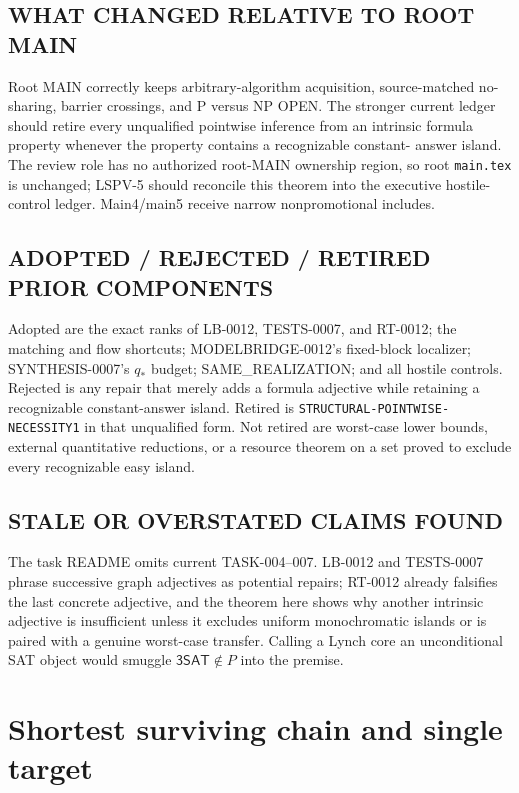\documentclass[11pt]{article}
\newcommand{\SAT}{\mathsf{3SAT}}
\begin{document}
\subsection*{WHAT CHANGED RELATIVE TO ROOT MAIN}
Root MAIN correctly keeps arbitrary-algorithm acquisition, source-matched
no-sharing, barrier crossings, and P versus NP OPEN.  The stronger current
ledger should retire every unqualified pointwise inference from an intrinsic
formula property whenever the property contains a recognizable constant-
answer island.  The review role has no authorized root-MAIN ownership
region, so root \texttt{main.tex} is unchanged; LSPV-5 should reconcile this
theorem into the executive hostile-control ledger.  Main4/main5 receive
narrow nonpromotional includes.

\subsection*{ADOPTED / REJECTED / RETIRED PRIOR COMPONENTS}
Adopted are the exact ranks of LB-0012, TESTS-0007, and RT-0012; the matching
and flow shortcuts; MODELBRIDGE-0012's fixed-block localizer; SYNTHESIS-0007's
$q_*$ budget; SAME\_REALIZATION; and all hostile controls.  Rejected is any
repair that merely adds a formula adjective while retaining a recognizable
constant-answer island.  Retired is
\texttt{STRUCTURAL-POINTWISE-NECESSITY1} in that unqualified form.  Not
retired are worst-case lower bounds, external quantitative reductions, or a
resource theorem on a set proved to exclude every recognizable easy island.

\subsection*{STALE OR OVERSTATED CLAIMS FOUND}
The task README omits current TASK-004--007.  LB-0012 and TESTS-0007 phrase
successive graph adjectives as potential repairs; RT-0012 already falsifies
the last concrete adjective, and the theorem here shows why another
intrinsic adjective is insufficient unless it excludes uniform
monochromatic islands or is paired with a genuine worst-case transfer.
Calling a Lynch core an unconditional SAT object would smuggle $\SAT\notin
P$ into the premise.

\section{Shortest surviving chain and single target}
\end{document}
